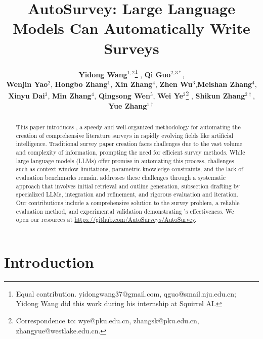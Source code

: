 \title{AutoSurvey: Large Language Models Can Automatically Write Surveys}

\author{
  \textbf{Yidong Wang}$^{1,2}$\thanks{Equal contribution. yidongwang37@gmail.com, qguo@smail.nju.edu.cn; Yidong Wang did this work during his internship at Squirrel AI.} , \textbf{Qi Guo}$^{2,3*}$, \\ \textbf{Wenjin Yao}$^{2}$, \textbf{Hongbo Zhang}$^{1}$, \textbf{Xin Zhang}$^{4}$, \textbf{Zhen Wu}$^{3}$,\textbf{Meishan Zhang}$^{4}$, \\ \textbf{Xinyu Dai}$^{3}$, \textbf{Min Zhang}$^{4}$, \textbf{Qingsong Wen}$^{5}$, \textbf{Wei Ye}$^{2}$\thanks{Correspondence to: wye@pku.edu.cn, zhangsk@pku.edu.cn, zhangyue@westlake.edu.cn.} , \textbf{Shikun Zhang}$^{2\dagger}$, \textbf{Yue Zhang}$^{1\dagger}$
}



\maketitle

\begin{abstract}
  This paper introduces \ourmethod, a speedy and well-organized methodology for automating the creation of comprehensive literature surveys in rapidly evolving fields like artificial intelligence. Traditional survey paper creation faces challenges due to the vast volume and complexity of information, prompting the need for efficient survey methods. While large language models (LLMs) offer promise in automating this process, challenges such as context window limitations, parametric knowledge constraints, and the lack of evaluation benchmarks remain. \ourmethod addresses these challenges through a systematic approach that involves initial retrieval and outline generation, subsection drafting by specialized LLMs, integration and refinement, and rigorous evaluation and iteration. Our contributions include a comprehensive solution to the survey problem, a reliable evaluation method, and experimental validation demonstrating \ourmethod's effectiveness. We open our resources at \url{https://github.com/AutoSurveys/AutoSurvey}.
\end{abstract}

\section{Introduction}

